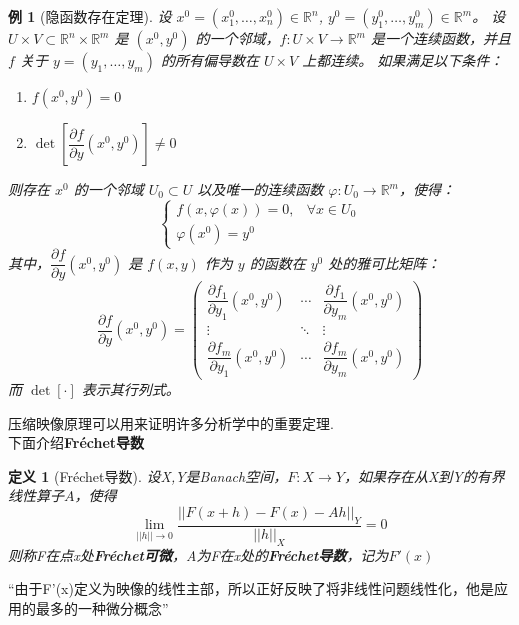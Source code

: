 \documentclass[12pt, a4paper, oneside, fontset=windows]{ctexbook}
\newtheorem{definition}{定义}[section]
\newtheorem{example}{例}[section]
\begin{document}
    \begin{example}[隐函数存在定理]
        设 $x^0 = (x_1^0, \dots, x_n^0) \in \mathbb{R}^n$, $y^0 = (y_1^0, \dots, y_m^0) \in \mathbb{R}^m$。
        设 $U \times V \subset \mathbb{R}^n \times \mathbb{R}^m$ 是 $(x^0, y^0)$ 的一个邻域，$f: U \times V \to \mathbb{R}^m$ 是一个连续函数，并且 $f$ 关于 $y = (y_1, \dots, y_m)$ 的所有偏导数在 $U \times V$ 上都连续。
        如果满足以下条件：
        \begin{enumerate}
            \item $f(x^0, y^0) = 0$
            \item $\det\left[\dfrac{\partial f}{\partial y}(x^0, y^0)\right] \neq 0$
        \end{enumerate}
        则存在 $x^0$ 的一个邻域 $U_0 \subset U$ 以及唯一的连续函数 $\varphi: U_0 \to \mathbb{R}^m$，使得：
        \[
            \begin{cases}
                f(x, \varphi(x)) = 0, & \forall x \in U_0 \\
                \varphi(x^0) = y^0
            \end{cases}
        \]
        其中，$\dfrac{\partial f}{\partial y}(x^0, y^0)$ 是 $f(x,y)$ 作为 $y$ 的函数在 $y^0$ 处的雅可比矩阵：
        \[
            \dfrac{\partial f}{\partial y}(x^0, y^0) = 
            \begin{pmatrix}
                \dfrac{\partial f_1}{\partial y_1}(x^0, y^0) & \cdots & \dfrac{\partial f_1}{\partial y_m}(x^0, y^0) \\
                \vdots & \ddots & \vdots \\
                \dfrac{\partial f_m}{\partial y_1}(x^0, y^0) & \cdots & \dfrac{\partial f_m}{\partial y_m}(x^0, y^0)
            \end{pmatrix}
        \]
        而 $\det[\cdot]$ 表示其行列式。
    \end{example}

    压缩映像原理可以用来证明许多分析学中的重要定理.\\

    下面介绍{\bf Fréchet导数}
    \begin{definition}[Fréchet导数]
        设X,Y是Banach空间，$F:X\to Y$，如果存在从X到Y的有界线性算子$A$，使得
        \[
            \lim_{||h||\to 0}\dfrac{||F(x+h)-F(x)-Ah||_Y}{||h||_X}=0
        \]
        则称F在点x处\textbf{Fréchet可微}，A为F在x处的\textbf{Fréchet导数}，记为$F'(x)$
    \end{definition}

    \begin{tcolorbox}
        “由于F'(x)定义为映像的线性主部，所以正好反映了将非线性问题线性化，他是应用的最多的一种微分概念”
    \end{tcolorbox}
\end{document}
